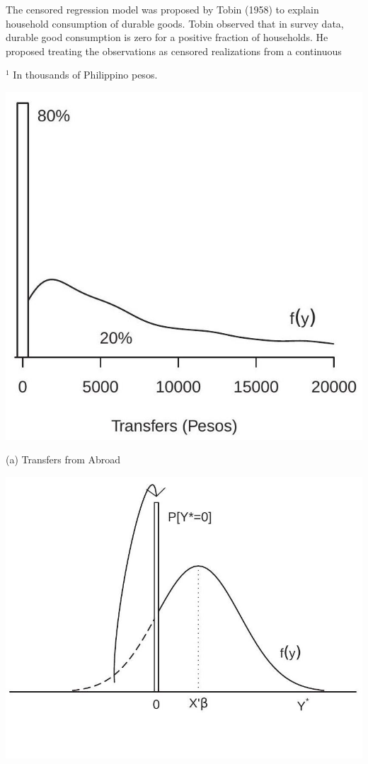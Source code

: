 \documentclass[10pt]{article}
\begin{document}
The censored regression model was proposed by Tobin (1958) to explain household consumption of durable goods. Tobin observed that in survey data, durable good consumption is zero for a positive fraction of households. He proposed treating the observations as censored realizations from a continuous

${ }^{1}$ In thousands of Philippino pesos.

\includegraphics[max width=\textwidth]{2022_10_23_36a5c875f975c7792a09g-02}

(a) Transfers from Abroad

\includegraphics[max width=\textwidth]{2022_10_23_36a5c875f975c7792a09g-02(1)}
\end{document}

